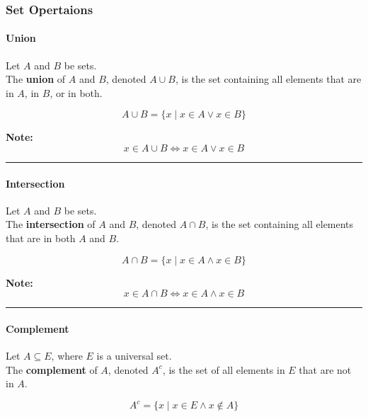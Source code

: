 \documentclass[
]{book}
\theoremstyle{definition}
\theoremstyle{definition}
\theoremstyle{definition}
\theoremstyle{definition}
\theoremstyle{remark}
\begin{document}
\subsubsection{Set Opertaions}\label{set-opertaions}

\paragraph{Union}\label{union}

Let \(A\) and \(B\) be sets.\\
The \textbf{union} of \(A\) and \(B\), denoted \(A \cup B\), is the set containing all elements that are in \(A\), in \(B\), or in both.

\[
A \cup B = \{ x \mid x \in A \lor x \in B \}
\]

\textbf{Note:}\\
\[
x \in A \cup B \iff x \in A \lor x \in B
\]

\begin{center}\rule{0.5\linewidth}{0.5pt}\end{center}

\paragraph{Intersection}\label{intersection}

Let \(A\) and \(B\) be sets.\\
The \textbf{intersection} of \(A\) and \(B\), denoted \(A \cap B\), is the set containing all elements that are in both \(A\) and \(B\).

\[
A \cap B = \{ x \mid x \in A \land x \in B \}
\]

\textbf{Note:}\\
\[
x \in A \cap B \iff x \in A \land x \in B
\]

\begin{center}\rule{0.5\linewidth}{0.5pt}\end{center}

\paragraph{Complement}\label{complement}

Let \(A \subseteq E\), where \(E\) is a universal set.\\
The \textbf{complement} of \(A\), denoted \(A^c\), is the set of all elements in \(E\) that are not in \(A\).

\[
A^c = \{ x \mid x \in E \land x \notin A \}
\]
\end{document}
